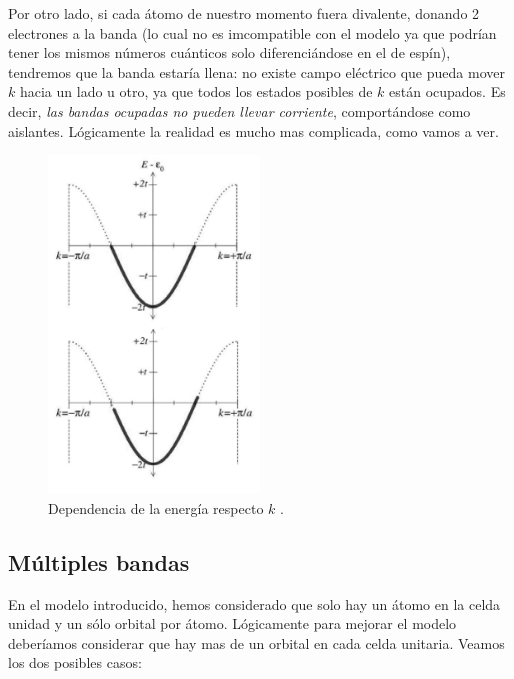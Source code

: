 Por otro lado, si cada átomo de nuestro momento fuera divalente, donando 2 electrones a la banda (lo cual no es imcompatible con el modelo ya que podrían tener los mismos números cuánticos solo diferenciándose en el de espín), tendremos que la banda estaría llena: no existe campo eléctrico que pueda mover $k$ hacia un lado u otro, ya que todos los estados posibles de $k$ están ocupados. Es decir, \textit{las bandas ocupadas no pueden llevar corriente}, comportándose como aislantes. Lógicamente la realidad es mucho mas complicada, como vamos a ver.


\begin{figure}[h!] \centering
	\includegraphics[width=0.5\textwidth]{Cuerpo/Ch_07/Oxford-07.png}
	\caption{Dependencia de la energía respecto $k$ \cite{Oxford_Solid_State}.}
	\label{Fig:07-01-03}
\end{figure}



\subsection{Múltiples bandas}

En el modelo introducido, hemos considerado que solo hay un átomo en la celda unidad y un sólo orbital por átomo. Lógicamente para mejorar el modelo deberíamos considerar que hay mas de un orbital en cada celda unitaria. Veamos los dos posibles casos:

